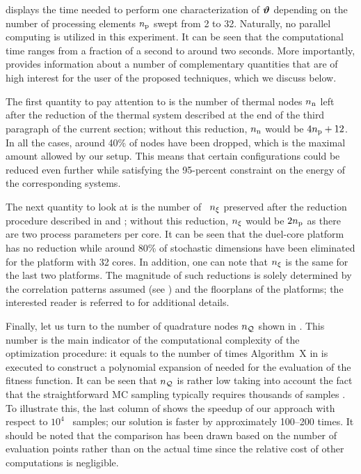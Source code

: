 
 displays the time needed to perform one characterization of $\bm{\vartheta}$ depending on the number of processing elements ${n_\text{p}}$ swept from 2 to 32.
Naturally, no parallel computing is utilized in this experiment.
It can be seen that the computational time ranges from a fraction of a second to around two seconds.
More importantly,  provides information about a number of complementary quantities that are of high interest for the user of the proposed techniques, which we discuss below.

The first quantity to pay attention to is the number of thermal nodes ${n_\text{n}}$ left after the reduction of the thermal system described at the end of the third paragraph of the current section; without this reduction, ${n_\text{n}}$ would be $4 {n_\text{p}} + 12$.
In all the cases, around 40\% of nodes have been dropped, which is the maximal amount allowed by our setup.
This means that certain configurations could be reduced even further while satisfying the 95-percent constraint on the energy of the corresponding systems.

The next quantity to look at is the number of \rvs\ ${n_\xi}$ preserved after the reduction procedure described in  and ; without this reduction, ${n_\xi}$ would be $2 {n_\text{p}}$ as there are two process parameters per core.
It can be seen that the duel-core platform has no reduction while around 80\% of stochastic dimensions have been eliminated for the platform with 32 cores.
In addition, one can note that ${n_\xi}$ is the same for the last two platforms.
The magnitude of such reductions is solely determined by the correlation patterns assumed (see ) and the floorplans of the platforms; the interested reader is referred to \cite{ukhov2014} for additional details.

Finally, let us turn to the number of quadrature nodes ${n_\mathcal{Q}}$ shown in .
This number is the main indicator of the computational complexity of the optimization procedure: it equals to the number of times Algorithm~X in  is executed to construct a polynomial expansion of  needed for the evaluation of the fitness function.
It can be seen that ${n_\mathcal{Q}}$ is rather low taking into account the fact that the straightforward MC sampling typically requires thousands of samples \cite{ukhov2014, lee2013, xiang2010, juan2012}.
To illustrate this, the last column of  shows the speedup of our approach with respect to $10^4$ \MC\ samples; our solution is faster by approximately 100--200 times.
It should be noted that the comparison has been drawn based on the number of evaluation points rather than on the actual time since the relative cost of other computations is negligible.
